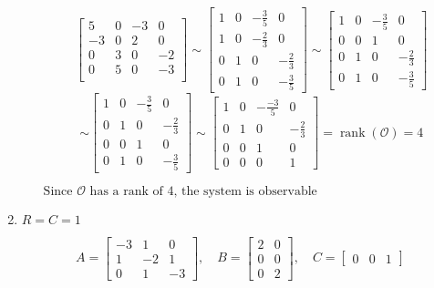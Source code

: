 \documentclass{article}
\begin{document}
\begin{enumerate}[label=\alph*)]
\begin{enumerate}[label=\roman*)]
    \[
    \begin{bmatrix}
        5 & 0 & -3 & 0 \\
        -3 & 0 & 2 & 0 \\
        0 & 3 & 0 & -2 \\
        0 & 5 & 0 & -3 \\
    \end{bmatrix}
    \sim
    \begin{bmatrix}
        1 & 0 & -\frac{3}{5} & 0 \\
        1 & 0 & -\frac{2}{3} & 0 \\
        0 & 1 & 0 & -\frac{2}{3} \\
        0 & 1 & 0 & -\frac{3}{5}
    \end{bmatrix}
    \sim
    \begin{bmatrix}
        1 & 0 & -\frac{3}{5} & 0 \\
        0 & 0 & 1 & 0 \\
        0 & 1 & 0 & -\frac{2}{3} \\
        0 & 1 & 0 & -\frac{3}{5}
    \end{bmatrix}
    \]
    \[
    \sim
    \begin{bmatrix}
        1 & 0 & -\frac{3}{5} & 0 \\
        0 & 1 & 0 & -\frac{2}{3} \\
        0 & 0 & 1 & 0 \\
        0 & 1 & 0 & -\frac{3}{5}
    \end{bmatrix}
    \sim
    \begin{bmatrix}
        1 & 0 & -\frac{-3}{5} & 0 \\
        0 & 1 & 0 & -\frac{2}{3} \\
        0 & 0 & 1 & 0 \\
        0 & 0 & 0 & 1
    \end{bmatrix}
    = \operatorname{rank}(\mathcal{O}) = 4
    \]

    $\boxed{\text{Since $\mathcal{O}$ has a rank of 4, the system is observable}}$


    \end{enumerate}

    \item $R = C = 1$

    \[
    A = 
    \begin{bmatrix}
        -3 & 1 & 0 \\
        1 & -2 & 1 \\
        0 & 1 & -3
    \end{bmatrix}
    ,\quad B = 
    \begin{bmatrix}
        2 & 0 \\
        0 & 0 \\
        0 & 2
    \end{bmatrix}
    , \quad C = 
    \begin{bmatrix}
        0 & 0 & 1
    \end{bmatrix}
    \]



\end{enumerate}
\end{document}
